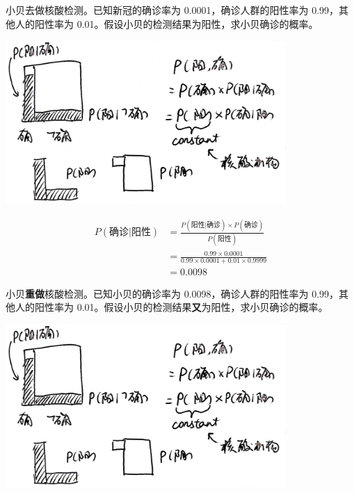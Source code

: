 \documentclass[UTF8]{ctexart}
\begin{document}
\begin{Exercise}
	小贝去做核酸检测。已知新冠的确诊率为 0.0001，确诊人群的阳性率为 0.99，其他人的阳性率为 0.01。假设小贝的检测结果为阳性，求小贝确诊的概率。
\end{Exercise}

\begin{center}
	\includegraphics[width=0.8\textwidth]{fig7.jpg}
\end{center}

\begin{Answer}
	\begin{equation}
		\begin{aligned}
			P(\text{确诊}|\text{阳性})
			 & = \frac{P(\text{阳性}|\text{确诊}) \times P(\text{确诊})}{P(\text{阳性})}    \\
			 & = \frac{0.99 \times 0.0001}{0.99 \times 0.0001 + 0.01 \times 0.9999} \\
			 & = 0.0098
		\end{aligned}
	\end{equation}
\end{Answer}

\begin{Exercise}
	小贝\textbf{重做}核酸检测。已知小贝的确诊率为 0.0098，确诊人群的阳性率为 0.99，其他人的阳性率为 0.01。假设小贝的检测结果\textbf{又}为阳性，求小贝确诊的概率。
\end{Exercise}


\begin{center}
	\includegraphics[width=0.8\textwidth]{fig7.jpg}
\end{center}
\end{document}
